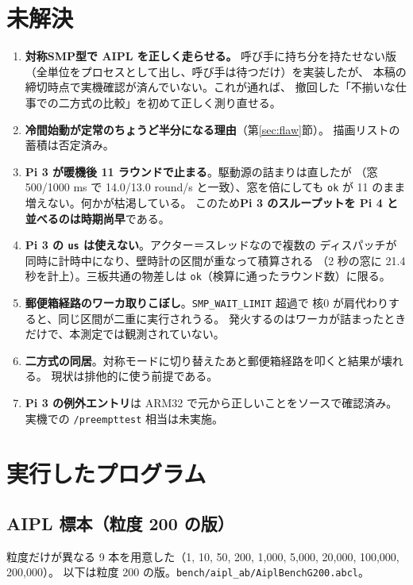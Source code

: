 \documentclass[a4paper,11pt]{ltjsarticle}
\begin{document}
\section{未解決}\label{sec:open}
\begin{enumerate}
\item \textbf{対称SMP型で AIPL を正しく走らせる。} 呼び手に持ち分を持たせない版
      （全単位をプロセスとして出し、呼び手は待つだけ）を実装したが、
      本稿の締切時点で実機確認が済んでいない。これが通れば、
      撤回した「不揃いな仕事での二方式の比較」を初めて正しく測り直せる。
\item \textbf{冷間始動が定常のちょうど半分になる理由}（第\ref{sec:flaw}節）。
      描画リストの蓄積は否定済み。
\item \textbf{Pi 3 が暖機後 11 ラウンドで止まる}。駆動源の詰まりは直したが
      （窓 500/1000 ms で 14.0/13.0 round/s と一致）、窓を倍にしても
      \texttt{ok} が 11 のまま増えない。何かが枯渇している。
      このため\textbf{Pi 3 のスループットを Pi 4 と並べるのは時期尚早}である。
\item \textbf{Pi 3 の \texttt{us} は使えない}。アクター＝スレッドなので複数の
      ディスパッチが同時に計時中になり、壁時計の区間が重なって積算される
      （2 秒の窓に 21.4 秒を計上）。三板共通の物差しは
      \texttt{ok}（検算に通ったラウンド数）に限る。
\item \textbf{郵便箱経路のワーカ取りこぼし}。\texttt{SMP\_WAIT\_LIMIT} 超過で
      核0 が肩代わりすると、同じ区間が二重に実行されうる。
      発火するのはワーカが詰まったときだけで、本測定では観測されていない。
\item \textbf{二方式の同居}。対称モードに切り替えたあと郵便箱経路を叩くと結果が壊れる。
      現状は排他的に使う前提である。
\item \textbf{Pi 3 の例外エントリ}は ARM32 で元から正しいことをソースで確認済み。
      実機での \texttt{/preempttest} 相当は未実施。
\end{enumerate}

\section{実行したプログラム}\label{sec:prog}

\subsection{AIPL 標本（粒度 200 の版）}
粒度だけが異なる 9 本を用意した（1, 10, 50, 200, 1{,}000, 5{,}000, 20{,}000, 100{,}000, 200{,}000）。
以下は粒度 200 の版。\texttt{bench/aipl\_ab/AiplBenchG200.abcl}。
\end{document}
